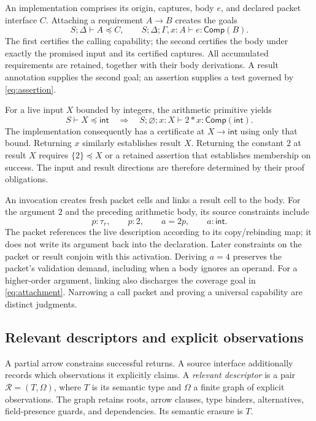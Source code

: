 \documentclass[10pt,a4paper]{article}
\newcommand{\Comp}{\mathsf{Comp}}
\newcommand{\Int}{\mathsf{int}}
\theoremstyle{remark}
\begin{document}
An implementation comprises its origin, captures, body $e$, and declared packet
interface $C$. Attaching a requirement $A\to B$ creates the goals
\begin{equation}\label{eq:attachment}
 S;\Delta\vdash A\preceq C,
 \qquad
 S;\Delta;\Gamma,x:A\vdash e:\Comp(B).
\end{equation}
The first certifies the calling capability; the second certifies the body under
exactly the promised input and its certified captures. All accumulated
requirements are retained, together with their body derivations. A result
annotation supplies the second goal; an assertion supplies a test governed by
\eqref{eq:assertion}.

For a live input $X$ bounded by integers, the arithmetic primitive yields
\[
 S\vdash X\preceq\Int
 \quad\Longrightarrow\quad
 S;\varnothing;x:X\vdash 2*x:\Comp(\Int).
\]
The implementation consequently has a certificate at $X\to\Int$ using only
that bound. Returning $x$ similarly establishes result $X$. Returning the
constant $2$ at result $X$ requires $\{2\}\preceq X$ or a retained assertion
that establishes membership on success. The input and result directions are
therefore determined by their proof obligations.

An invocation creates fresh packet cells and links a result cell to the body.
For the argument $2$ and the preceding arithmetic body, its source constraints
include
\begin{equation}\label{eq:livecall}
 p:\tau_r,\qquad p:2,\qquad a=2p,\qquad a:\Int.
\end{equation}
The packet references the live description according to its copy/rebinding map;
it does not write its argument back into the declaration. Later constraints
on the packet or result conjoin with this activation. Deriving $a=4$ preserves
the packet's validation demand, including when a body ignores an operand.
For a higher-order argument, linking also discharges the coverage goal in
\eqref{eq:attachment}. Narrowing a call packet and proving a universal
capability are distinct judgments.

\subsection{Relevant descriptors and explicit observations}
A partial arrow constrains successful returns. A source interface additionally
records which observations it explicitly claims. A \emph{relevant descriptor}
is a pair $\mathcal R=(T,\Omega)$, where $T$ is its semantic type and $\Omega$
a finite graph of explicit observations. The graph retains roots, arrow
clauses, type binders, alternatives, field-presence guards, and dependencies.
Its semantic erasure is $T$.
\end{document}
